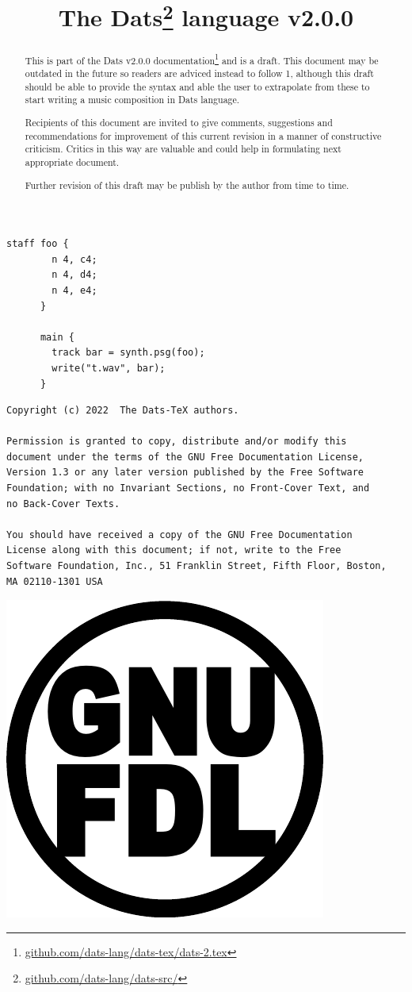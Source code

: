 \documentclass[10pt, twoside]{article}
\title{\textbf{The Dats\thanks{\url{github.com/dats-lang/dats-src/}} language v2.0.0}}
\begin{document}
\maketitle
\thispagestyle{fancy}

\begin{Verbatim}[frame=single, label=The "Hello World" of Dats]
      staff foo {
        n 4, c4;
        n 4, d4;
        n 4, e4;
      }

      main {
        track bar = synth.psg(foo);
        write("t.wav", bar);
      }
\end{Verbatim}
\vspace{1in}
\begin{abstract}
This is part of the Dats v2.0.0 documentation\footnote{\url{github.com/dats-lang/dats-tex/dats-2.tex}}
and is a draft. This document may be outdated in the future so readers are adviced instead to
follow 1, although this draft should be able to provide the syntax and able the user to
extrapolate from these to start writing a music composition in Dats language.

Recipients of this document are invited to give comments, suggestions and recommendations
for improvement of this current revision in a manner of constructive criticism.
Critics in this way are valuable and could help in formulating next appropriate
document.

Further revision of this draft may be publish by the author from time to time.
\end{abstract}

\clearpage
\vspace*{6in}

\begin{minipage}[t]{5in}
\begin{Verbatim}[fontsize=\small]
Copyright (c) 2022  The Dats-TeX authors.

Permission is granted to copy, distribute and/or modify this
document under the terms of the GNU Free Documentation License,
Version 1.3 or any later version published by the Free Software
Foundation; with no Invariant Sections, no Front-Cover Text, and
no Back-Cover Texts. 

You should have received a copy of the GNU Free Documentation
License along with this document; if not, write to the Free
Software Foundation, Inc., 51 Franklin Street, Fifth Floor, Boston,
MA 02110-1301 USA
\end{Verbatim}
\bigskip

\indent \includegraphics[width=.5in]{fdl.pdf}
\end{minipage}
\end{document}
